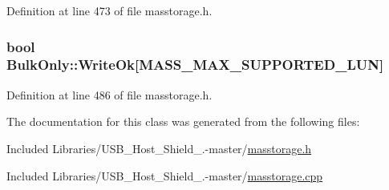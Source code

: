 \-Definition at line 473 of file masstorage.\-h.

\hypertarget{class_bulk_only_af763ffffdd131949322d583fb4cd2737}{
\subsubsection[{\-Write\-Ok}]{\setlength{\rightskip}{0pt plus 5cm}bool {\bf \-Bulk\-Only\-::\-Write\-Ok}\mbox{[}\-M\-A\-S\-S\-\_\-\-M\-A\-X\-\_\-\-S\-U\-P\-P\-O\-R\-T\-E\-D\-\_\-\-L\-U\-N\mbox{]}}}\label{class_bulk_only_af763ffffdd131949322d583fb4cd2737}


\-Definition at line 486 of file masstorage.\-h.



\-The documentation for this class was generated from the following files\-:\begin{DoxyCompactItemize}
\item 
\-Included Libraries/\-U\-S\-B\-\_\-\-Host\-\_\-\-Shield\-\_.-\/master/\hyperlink{masstorage_8h}{masstorage.\-h}\item 
\-Included Libraries/\-U\-S\-B\-\_\-\-Host\-\_\-\-Shield\-\_.-\/master/\hyperlink{masstorage_8cpp}{masstorage.\-cpp}\end{DoxyCompactItemize}
